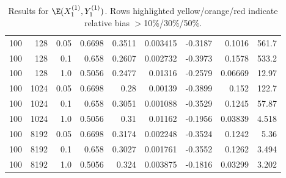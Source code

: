 \documentclass{article}
\begin{document}
\begin{table}[htbp]
\begin{tabular}{rrr|rrrrrr}
\midrule
\rowcolor{orange!50}100 & 128 & 0.05 & 0.6698 & 0.3511 & 0.003415 & -0.3187 & 0.1016 & 561.7 \\
\rowcolor{red!40}100 & 128 & 0.1 & 0.658 & 0.2607 & 0.002732 & -0.3973 & 0.1578 & 533.2 \\
\rowcolor{red!40}100 & 128 & 1.0 & 0.5056 & 0.2477 & 0.01316 & -0.2579 & 0.06669 & 12.97 \\
\midrule
\rowcolor{red!40}100 & 1024 & 0.05 & 0.6698 & 0.28 & 0.00139 & -0.3899 & 0.152 & 122.7 \\
\rowcolor{red!40}100 & 1024 & 0.1 & 0.658 & 0.3051 & 0.001088 & -0.3529 & 0.1245 & 57.87 \\
\rowcolor{orange!50}100 & 1024 & 1.0 & 0.5056 & 0.31 & 0.01162 & -0.1956 & 0.03839 & 4.518 \\
\midrule
\rowcolor{red!40}100 & 8192 & 0.05 & 0.6698 & 0.3174 & 0.002248 & -0.3524 & 0.1242 & 5.36 \\
\rowcolor{red!40}100 & 8192 & 0.1 & 0.658 & 0.3027 & 0.001761 & -0.3552 & 0.1262 & 3.494 \\
\rowcolor{orange!50}100 & 8192 & 1.0 & 0.5056 & 0.324 & 0.003875 & -0.1816 & 0.03299 & 3.202 \\
\bottomrule
\end{tabular}
\caption{Results for $\E(X_1^{(1)}, Y_1^{(1)})$. Rows highlighted yellow/orange/red indicate relative bias $>$10\%/30\%/50\%.}
\label{tab:x1y1}
\end{table}
\end{document}
